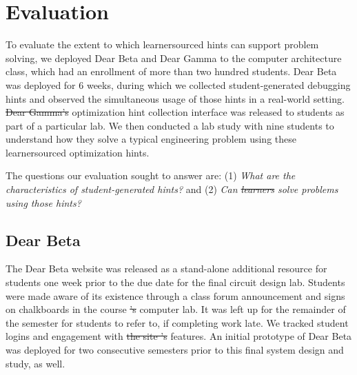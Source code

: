 \documentclass[12pt,twoside]{mitthesis}
\providecommand{\DIFaddtex}[1]{{\protect\color{blue}\uwave{#1}}} %
\providecommand{\DIFdeltex}[1]{{\protect\color{red}\sout{#1}}}                      %
\providecommand{\DIFaddbegin}{} %
\providecommand{\DIFaddend}{} %
\providecommand{\DIFdelbegin}{} %
\providecommand{\DIFdelend}{} %
\providecommand{\DIFaddbeginFL}{} %
\providecommand{\DIFaddendFL}{} %
\providecommand{\DIFdelbeginFL}{} %
\providecommand{\DIFdelendFL}{} %
\providecommand{\DIFadd}[1]{\texorpdfstring{\DIFaddtex{#1}}{#1}} %
\providecommand{\DIFdel}[1]{\texorpdfstring{\DIFdeltex{#1}}{}} %
\begin{document}
\begin{figure}
\DIFdelbeginFL %
\DIFdelendFL \DIFaddbeginFL \label{fig:sankey}
\DIFaddendFL \end{figure}


\section{Evaluation}

To evaluate the extent to which learnersourced hints can support problem solving, we deployed Dear Beta and Dear Gamma to the computer architecture class, which had an enrollment of more than two hundred students. Dear Beta was deployed for 6 weeks, during which we collected student-generated debugging hints and observed the simultaneous usage of those hints in a real-world setting. \DIFdelbegin \DIFdel{Dear Gamma's }\DIFdelend \DIFaddbegin \DIFadd{The Dear Gamma }\DIFaddend optimization hint collection interface was released to students as part of a particular lab. We then conducted a lab study with nine students to understand how they solve a typical engineering problem using these learnersourced optimization hints. \DIFdelbegin %

\DIFdelend The questions our evaluation sought to answer are: (1) {\it What are the characteristics of student-generated hints?} and (2) {\it Can \DIFdelbegin \DIFdel{learners }\DIFdelend \DIFaddbegin \DIFadd{students }\DIFaddend solve problems using those hints?}

\DIFdelbegin %
\DIFdelend \DIFaddbegin \subsection{Dear Beta}
\DIFaddend The Dear Beta website was released as a stand-alone additional resource for students one week prior to the due date for the final circuit design lab. Students were made aware of its existence through a class forum announcement and signs on chalkboards in the course \DIFdelbegin \DIFdel{'s }\DIFdelend computer lab. It was left up for the remainder of the semester for students to refer to, if completing work late. We tracked student logins and engagement with \DIFdelbegin \DIFdel{the site 's }\DIFdelend \DIFaddbegin \DIFadd{site }\DIFaddend features. An initial prototype of Dear Beta was deployed for two consecutive semesters prior to this final system design and study, as well.
\end{document}
